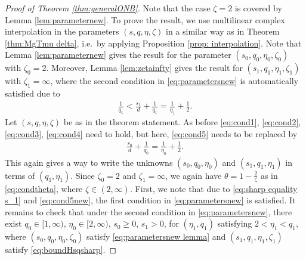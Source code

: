 \documentclass[10pt,a4paper]{amsart}
\begin{document}
\begin{proof}[Proof of Theorem \ref{thm:generalONB}]
Note that the case $\zeta = 2$ is covered by Lemma \ref{lem:parameternew}.
To prove the result, we use multilinear complex interpolation in the parameters $(s, q, \eta, \zeta)$ in a similar way as in Theorem \ref{thm:MgTmu delta}, i.e.\ by applying Proposition \ref{prop: interpolation}.
Note that Lemma \ref{lem:parameternew} gives the result for the parameter $(s_0, q_0, \eta_0, \zeta_0)$ with $\zeta_0 = 2$. Moreover, Lemma \ref{lem:zetainfty} gives the result for $(s_1, q_1, \eta_1, \zeta_1)$ with $\zeta_1=\infty$, where the second condition in \eqref{eq:parametersnew} is automatically satisfied due to
\begin{align}
\label{eq:sharp equality s_1}
    \frac{1}{q_1}<\frac{s_1}{d}+\frac{1}{q_1} = \frac{1}{\eta_1} + \frac{1}{2}.
\end{align}
Let $(s, q, \eta, \zeta)$ be as in the theorem statement. As before \eqref{eq:cond1}, \eqref{eq:cond2}, \eqref{eq:cond3}, \eqref{eq:cond4} need to hold, but here, \eqref{eq:cond5} needs to be replaced by 
\begin{align}
\label{eq:cond5new}
\frac{s_0}{d} + \frac{1}{q_0} = \frac{1}{\eta_0} +\frac12.
\end{align}
This again gives a way to write the unknowns $(s_0, q_0, \eta_0)$ and $(s_1, q_1, \eta_1)$ in terms of $(q_1, \eta_1)$.
Since $\zeta_0 = 2$ and $\zeta_1=\infty$, we again have $\theta = 1-\frac{2}{\zeta}$ as in \eqref{eq:condtheta}, where $\zeta\in (2, \infty)$. 
First, we note that due to \eqref{eq:sharp equality s_1} and \eqref{eq:cond5new}, the first condition in \eqref{eq:parametersnew} is satisfied.
It remains to check that under the second condition in \eqref{eq:parametersnew}, there exist $q_0\in [1, \infty)$, $\eta_0\in [2, \infty)$, $s_0\geq 0$, $s_1>0$, for  $(\eta_1, q_1)$ satisfying $2<\eta_1<q_1$, where $(s_0,q_0,\eta_0,\zeta_0)$ satisfy \eqref{eq:parametersnew lemma} and $(s_1,q_1,\eta_1,\zeta_1)$ satisfy \eqref{eq:boundHsqsharp}.


\end{proof}
\end{document}
